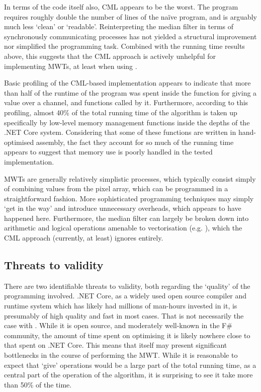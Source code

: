 In terms of the code itself also, CML appears to be the worst.  The program requires roughly double the number of lines of the naïve program, and is arguably much less `clean' or `readable'.  Reinterpreting the median filter in terms of synchronously communicating processes has not yielded a structural improvement nor simplified the programming task.  Combined with the running time results above, this suggests that the CML approach is actively unhelpful for implementing MWTs, at least when using \hopac{}.  %

Basic profiling of the CML-based implementation appears to indicate that more than half of the runtime of the program was spent inside the function for giving a value over a channel, and functions called by it.  Furthermore, according to this profiling, almost 40\% of the total running time of the algorithm is taken up specifically by low-level memory management functions inside the depths of the .NET Core system.  Considering that some of these functions are written in hand-optimised assembly, the fact they account for so much of the running time appears to suggest that memory use is poorly handled in the tested implementation.

MWTs are generally relatively simplistic processes, which typically consist simply of combining values from the pixel array, which can be programmed in a straightforward fashion.  More sophisticated programming techniques may simply `get in the way' and introduce unnecessary overheads, which appears to have happened here.  Furthermore, the median filter can largely be broken down into arithmetic and logical operations amenable to vectorisation (e.g. \cite{Sanchez2012,Perreault2007}), which the CML approach (currently, at least) ignores entirely.

\subsection{Threats to validity}
There are two identifiable threats to validity, both regarding the `quality' of the programming involved.  .NET Core, as a widely used open source compiler and runtime system which has likely had millions of man-hours invested in it, is presumably of high quality and fast in most cases.  That is not necessarily the case with \hopac{}.  While it is open source, and moderately well-known in the F\# community, the amount of time spent on optimising it is likely nowhere close to that spent on .NET Core.  This means that \hopac{} itself may present significant bottlenecks in the course of performing the MWT.  While it is reasonable to expect that `give' operations would be a large part of the total running time, as a central part of the operation of the algorithm, it is surprising to see it take more than 50\% of the time.

